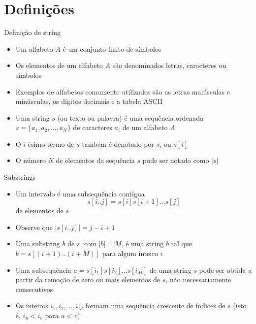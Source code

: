 \section{Definições}

\begin{frame}[fragile]{Definição de string}

    \begin{itemize}
        \item Um alfabeto $A$ é um conjunto finito de símbolos
        \pause

        \item Os elementos de um alfabeto $A$ são denominados letras, caracteres ou símbolos
        \pause

        \item Exemplos de alfabetos comumente utilizados são as letras maiúsculas e minúsculas, 
            os dígitos decimais e a tabela ASCII
        \pause

        \item Uma string $s$ (ou texto ou palavra) é uma sequência ordenada $s = \lbrace a_1, a_2, 
        \ldots, a_N\rbrace$ de caracteres $a_i$ de um alfabeto $A$
        \pause

        \item O $i$-ésimo termo de $s$ também é denotado por $s_i$ ou $s[i]$
        \pause

        \item O número $N$ de elementos da sequência $s$ pode ser notado como $|s|$

    \end{itemize}

\end{frame}


\begin{frame}[fragile]{Substrings}

    \begin{itemize}
        \item Um intervalo é uma subsequência contígua 
        \[
            s[i..j] = s[i]s[i+1]\ldots s[j]
        \] de elementos de $s$
        \pause

        \item Observe que $|s[i..j]| = j - i + 1$ 
        \pause

        \item Uma substring $b$ de $s$, com $|b| = M$, é uma string $b$ tal que $b = s[(i+1)..(i+M)]$ 
            para algum inteiro $i$
        \pause

        \item Uma subsequência $a = s[i_1]s[i_2]\ldots s[i_M]$ de uma string $s$ pode ser obtida a 
            partir da remoção de zero ou mais elementos de $s$, não necessariamente consecutivos
        \pause

        \item Os inteiros $i_1, i_2, ..., i_M$ formam uma sequência crescente de índices de $s$ 
            (isto é, $i_u < i_v$ para $u < v$)
    \end{itemize}

\end{frame}


